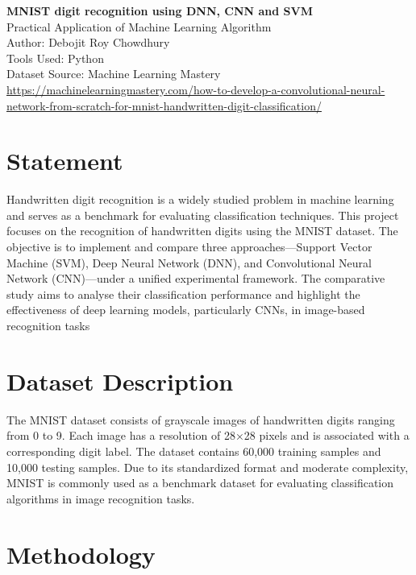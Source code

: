\documentclass[11pt,a4paper]{article}
\begin{document}
	
	\begin{center}
		\Large \textbf{MNIST digit recognition using DNN, CNN and SVM}\\[0.2cm]
		\normalsize
		Practical Application of Machine Learning Algorithm \\
		Author: Debojit Roy Chowdhury \\[0.1cm]
		Tools Used: Python \\[0.1cm]
		Dataset Source: Machine Learning Mastery \\
		\url{https://machinelearningmastery.com/how-to-develop-a-convolutional-neural-network-from-scratch-for-mnist-handwritten-digit-classification/}
	\end{center}
	
	\vspace{0.3cm}
	
	\section{Statement}
	
	Handwritten digit recognition is a widely studied problem in machine learning and serves as a benchmark for evaluating classification techniques. This project focuses on the recognition of handwritten digits using the MNIST dataset. The objective is to implement and compare three approaches—Support Vector Machine (SVM), Deep Neural Network (DNN), and Convolutional Neural Network (CNN)—under a unified experimental framework. The comparative study aims to analyse their classification performance and highlight the effectiveness of deep learning models, particularly CNNs, in image-based recognition tasks
	
	\section{Dataset Description}
	
	The MNIST dataset consists of grayscale images of handwritten digits ranging from 0 to 9. Each image has a resolution of 28×28 pixels and is associated with a corresponding digit label. The dataset contains 60,000 training samples and 10,000 testing samples. Due to its standardized format and moderate complexity, MNIST is commonly used as a benchmark dataset for evaluating classification algorithms in image recognition tasks.
	
	\section{Methodology}
	
\end{document}
